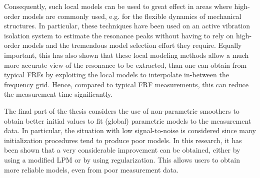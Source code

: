 Consequently, such local models can be used to great effect in areas where high-order models are commonly used, e.g. for the flexible dynamics of mechanical structures. In particular, these techniques have been used on an active vibration isolation system to estimate the resonance peaks without having to rely on high-order models and the tremendous model selection effort they require. Equally important, this has also shown that these local modeling methods allow a much more accurate view of the resonance to be extracted, than one can obtain from typical FRFs by exploiting the local models to interpolate in-between the frequency grid. Hence, compared to typical FRF measurements, this can reduce the measurement time significantly.

The final part of the thesis considers the use of non-parametric smoothers to obtain better initial values to fit (global) parametric models to the measurement data. In particular, the situation with low signal-to-noise is considered since many initialization procedures tend to produce poor models. In this research, it has been shown that a very considerable improvement can be obtained, either by using a modified LPM or by using regularization. This allows users to obtain more reliable models, even from poor measurement data.
